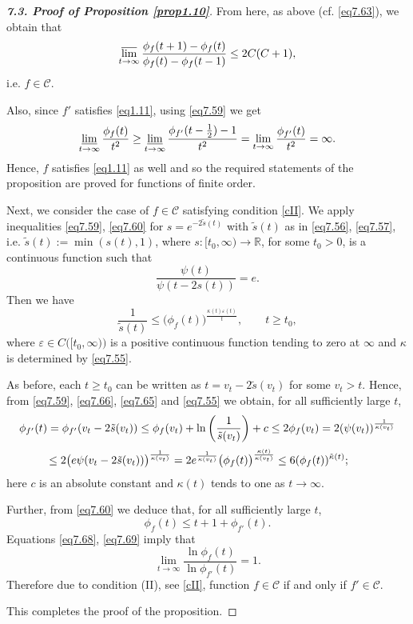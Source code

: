 \documentclass[11pt, oneside]{amsart}
\begin{document}
\begin{proof}[{\bf 7.3. Proof of Proposition \ref{prop1.10}}]
From here, as above (cf. \eqref{eq7.63}), we obtain that
\[
\varlimsup_{t\rightarrow\infty}\frac{\phi_{f}(t+1)-\phi_{f}(t)}{\phi_{f}(t)-\phi_{f}(t-1)}
\le 2C(C+1),
\]
i.e. $f\in\mathscr C$.

Also, since $f'$ satisfies \eqref{eq1.11}, using \eqref{eq7.59} we get
\[
\varliminf_{t\rightarrow\infty}\frac{\phi_{f}(t)}{t^2}\ge \varliminf_{t\rightarrow\infty} \frac{\phi_{f'}(t-\frac 12)-1}{t^2}=\lim_{t\rightarrow\infty}\frac{\phi_{f'}(t)}{t^2}=\infty.
\]
Hence, $f$ satisfies \eqref{eq1.11} as well and so the required statements of the proposition are proved for functions of finite order.

Next, we consider the case of $f\in\mathscr C$ satisfying condition \eqref{cII}. We apply inequalities \eqref{eq7.59}, \eqref{eq7.60} for $s=e^{-2\tilde s(t)}$ with $\tilde s(t)$ as in \eqref{eq7.56}, \eqref{eq7.57}, i.e. $\tilde s(t):=\min(s(t),1)$, where $s: [t_0,\infty)\rightarrow\mathbb R$, for some $t_0>0$, is a continuous function such that
\begin{equation}\label{eq7.66}
\frac{\psi(t)}{\psi(t-2s(t))}=e.
\end{equation}
Then we have
\begin{equation}\label{eq7.67}
\frac{1}{\tilde s(t)}\le \bigl(\phi_f(t)\bigr)^{\frac{\kappa(t)\varepsilon(t)}{t}},\qquad t\ge t_0,
\end{equation}
where $\varepsilon\in C\bigl([t_0,\infty)\bigr)$ is a positive continuous function tending to zero at $\infty$ and $\kappa$ is determined by \eqref{eq7.55}.

As before, each $t\ge t_0$ can be written as
$t=v_t-2\tilde s(v_t)$ for some $v_t> t$. Hence, from \eqref{eq7.59}, \eqref{eq7.66}, \eqref{eq7.65} and \eqref{eq7.55} we obtain, for all sufficiently large $t$,
\begin{equation}\label{eq7.68}
\begin{array}{l}
\displaystyle
\phi_{f'}(t)=\phi_{f'}(v_t-2\tilde s(v_t))\le \phi_f (v_t)+\ln\left(\frac{1}{\tilde s(v_t)}\right) +c\le 2\phi_f(v_t)=2(\psi(v_t))^{\frac{1}{\kappa(v_t)}}\medskip\\
\displaystyle \qquad\ \  \le 2\bigl(e\psi(v_t-2\tilde s(v_t))\bigr)^{\frac{1}{\kappa(v_t)}}=2e^{\frac{1}{\kappa(v_t)}}\bigl(\phi_f(t)\bigr)^{\frac{\kappa(t)}{\kappa(v_t)}}\le 6(\phi_f(t))^{\tilde\kappa(t)};
\end{array}
\end{equation}
here $c$ is an absolute constant and $\kappa(t)$ tends to one as $t\rightarrow\infty$.

Further, from \eqref{eq7.60} we deduce that, for all sufficiently large $t$,
\begin{equation}\label{eq7.69}
\phi_f(t)\le t+1+ \phi_{f'}(t).
\end{equation}
Equations \eqref{eq7.68}, \eqref{eq7.69} imply that
\[
\lim_{t\rightarrow\infty}\frac{\ln\phi_f(t)}{\ln\phi_{f'}(t)}=1.
\]
Therefore due to condition (II), see \eqref{cII}, function $f\in\mathscr C$ if and only if $f'\in\mathscr C$.

This completes the proof of the proposition. 
\end{proof}
\end{document}

